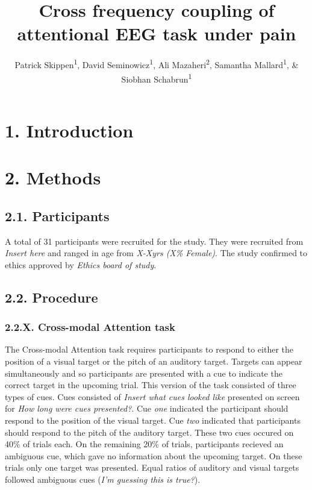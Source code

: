 \documentclass[
  english,
  ,man,floatsintext]{apa6}
\author{Patrick Skippen\textsuperscript{1}, David Seminowicz\textsuperscript{1}, Ali Mazaheri\textsuperscript{2}, Samantha Mallard\textsuperscript{1}, \& Siobhan Schabrun\textsuperscript{1}}
\affiliation{
\vspace{0.5cm}
\textsuperscript{1} Neuroscience Research Australia, Randwick Australia\\\textsuperscript{2} Where-ever Ali is, Country}
\title{Cross frequency coupling of attentional EEG task under pain}
\date{}
\begin{document}
\maketitle

\setlength{\abovedisplayskip}{-20pt}
\setlength{\belowdisplayskip}{3pt}
\setlength{\abovedisplayshortskip}{-30pt}
\setlength{\belowdisplayshortskip}{3pt}

\hypertarget{introduction}{%
\section{1. Introduction}\label{introduction}}

\hypertarget{methods}{%
\section{2. Methods}\label{methods}}

\hypertarget{participants}{%
\subsection{2.1. Participants}\label{participants}}

A total of 31 participants were recruited for the study. They were recruited from \emph{Insert here} and ranged in age from \emph{X-Xyrs (X\% Female)}. The study confirmed to ethics approved by \emph{Ethics board of study}.

\hypertarget{procedure}{%
\subsection{2.2. Procedure}\label{procedure}}

\hypertarget{x.-cross-modal-attention-task}{%
\subsubsection{2.2.X. Cross-modal Attention task}\label{x.-cross-modal-attention-task}}

The Cross-modal Attention task requires participants to respond to either the position of a visual target or the pitch of an auditory target. Targets can appear simultaneously and so participants are presented with a cue to indicate the correct target in the upcoming trial. This version of the task consisted of three types of cues. Cues consisted of \emph{Insert what cues looked like} presented on screen for \emph{How long were cues presented?}. Cue \emph{one} indicated the participant should respond to the position of the visual target. Cue \emph{two} indicated that participants should respond to the pitch of the auditory target. These two cues occured on 40\% of trials each. On the remaining 20\% of trials, participants recieved an ambiguous cue, which gave no information about the upcoming target. On these trials only one target was presented. Equal ratios of auditory and visual targets followed ambiguous cues (\emph{I'm guessing this is true?}).
\end{document}
